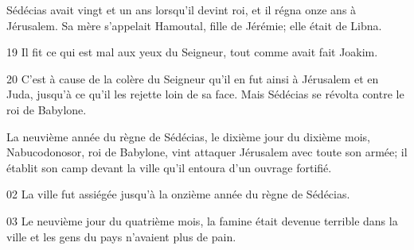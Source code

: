 Sédécias avait vingt et un ans lorsqu’il devint roi, et il régna onze ans à Jérusalem. Sa mère s’appelait Hamoutal, fille de Jérémie; elle était de Libna.

19 Il fit ce qui est mal aux yeux du Seigneur, tout comme avait fait Joakim.

20 C’est à cause de la colère du Seigneur qu’il en fut ainsi à Jérusalem et en Juda, jusqu’à ce qu’il les rejette loin de sa face. Mais Sédécias se révolta contre le roi de Babylone.

La neuvième année du règne de Sédécias, le dixième jour du dixième mois, Nabucodonosor, roi de Babylone, vint attaquer Jérusalem avec toute son armée; il établit son camp devant la ville qu’il entoura d’un ouvrage fortifié.

02 La ville fut assiégée jusqu’à la onzième année du règne de Sédécias.

03 Le neuvième jour du quatrième mois, la famine était devenue terrible dans la ville et les gens du pays n’avaient plus de pain.
